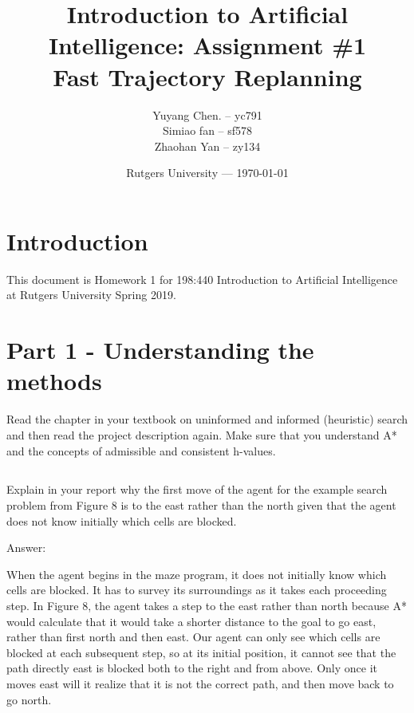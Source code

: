 \documentclass{article}
\title{Introduction to Artificial Intelligence: Assignment \#1\\Fast Trajectory Replanning} %
\author{Yuyang Chen. -- yc791\\ Simiao fan -- sf578\\ Zhaohan Yan -- zy134} %
\date{Rutgers University --- \today} %
\begin{document}
\maketitle %


\section*{Introduction} %

\begin{info} %
	This document is Homework 1 for 198:440 Introduction to Artificial Intelligence at Rutgers University Spring 2019.
\end{info}


\section{Part 1 - Understanding the methods} %

Read the chapter in your textbook on uninformed and informed
(heuristic) search and then read the project description again. Make sure that you understand A* and the concepts of
admissible and consistent h-values.


\subsection{}

\begin{question}
	Explain in your report why the first move of the agent for the example search problem from Figure 8 is to the east rather
than the north given that the agent does not know initially which cells are blocked.

\end{question}

Answer: \newline
\par When the agent begins in the maze program, it does not initially know which cells are blocked. It has to survey its surroundings as it takes each proceeding step. In Figure 8, the agent takes a step to the east rather than north because A* would calculate that it would take a shorter distance to the goal to go east, rather than first north and then east. Our agent can only see which cells are blocked at each subsequent step, so at its initial position, it cannot see that the path directly east is blocked both to the right and from above. Only once it moves east will it realize that it is not the correct path, and then move back to go north.
	
\end{document}
